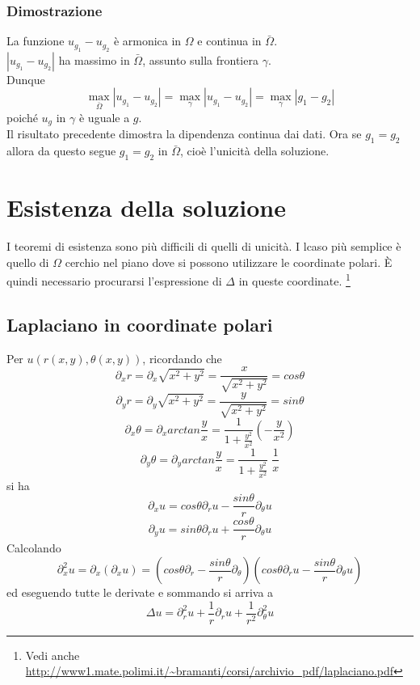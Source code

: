 \subsubsection{Dimostrazione}
La funzione $u_{g_1} - u_{g_2}$ \`e armonica in $\Omega$ e continua in
$\bar{\Omega}$.\\
$\left| u_{g_1} - u_{g_2} \right|$ ha massimo in $\bar{\Omega}$, assunto sulla
frontiera $\gamma$. \\ Dunque
\[
	\max_{\bar{\Omega}} \left| u_{g_1} - u_{g_2} \right|=
	\max_{\gamma} \left| u_{g_1} - u_{g_2} \right|=
	\max_{\gamma} \left| g_1 - g_2 \right|
\]
poich\'e $u_g$ in $\gamma$ \`e uguale a $g$.\\
Il risultato precedente dimostra la dipendenza continua dai dati.
Ora se $g_1=g_2$ allora da questo segue $g_1=g_2$ in $\bar{\Omega}$, cio\`e
l'unicit\`a della soluzione.
\section{Esistenza della soluzione}
I teoremi di esistenza sono pi\`u difficili di quelli di unicit\`a.
I lcaso pi\`u semplice \`e quello di $\Omega$ cerchio nel piano dove si
possono utilizzare le coordinate polari. \`E quindi necessario procurarsi
l'espressione di $\Delta$ in queste coordinate.
\footnote{Vedi anche
\url{http://www1.mate.polimi.it/~bramanti/corsi/archivio_pdf/laplaciano.pdf}}
\subsection{Laplaciano in coordinate polari}
Per $u(r(x,y), \theta (x,y))$, ricordando che
\[
	\partial_x r= \partial_x\sqrt{x^2 + y^2}=\frac{x}{\sqrt{x^2 + y^2}}= cos
\theta
\]
\[
	\partial_y r= \partial_y\sqrt{x^2 + y^2}=\frac{y}{\sqrt{x^2 + y^2}}= sin
\theta
\]
\[
	\partial_x \theta= \partial_x arctan \frac{y}{x}=
	\frac{1}{1 +\frac{y^2}{x^2}} \left( - \frac{y}{x^2} \right)
\]
\[
	\partial_y \theta= \partial_y arctan \frac{y}{x}=
	\frac{1}{1 +\frac{y^2}{x^2}} \; \frac{1}{x}
\]
si ha
\[
	\partial_x u= cos \theta \partial_r u - \frac{sin \theta}{r}
\partial_{\theta} u
\]
\[
	\partial_y u= sin \theta \partial_r u + \frac{cos \theta}{r}
\partial_{\theta} u
\]
Calcolando
\[
	\partial_x^2 u = \partial_x(\partial_x u)=
	\left( cos \theta \partial_r  - \frac{sin \theta}{r} \partial_{\theta}
\right)
	\left( cos \theta \partial_r u - \frac{sin \theta}{r} \partial_{\theta}
u \right)
\]
ed eseguendo tutte le derivate e sommando si arriva a
\[
	\Delta u = \partial^2_r u + \frac{1}{r} \partial_r u
+\frac{1}{r^2}\partial^2_{\theta} u
\]
